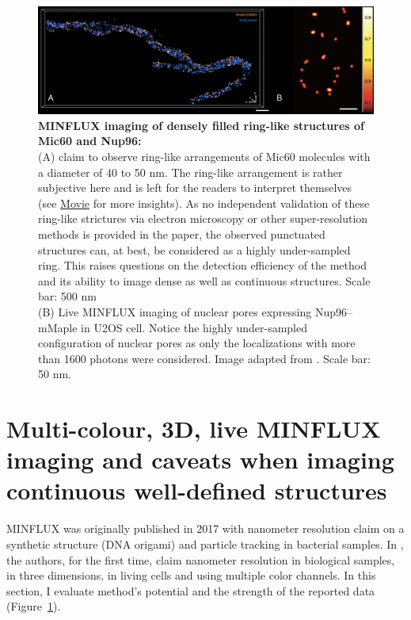 \documentclass[9pt,twocolumn,twoside]{pnas-new}
\begin{document}
\begin{figure}
\begin{center}
\includegraphics[width=17cm]{Figures/dense}
\end{center}
\caption[]{\textbf{MINFLUX imaging of densely filled ring-like structures of Mic60 and Nup96:} \\
(A) \cite{pape2020multicolor} claim to observe ring-like arrangements of Mic60 molecules with a diameter of 40 to 50 nm. The ring-like arrangement is rather subjective here and is left for the readers to interpret themselves (see  \href{http://movie-usa.glencoesoftware.com/video/10.1073/pnas.2009364117/video-6}{Movie} for more insights). As no independent validation of these ring-like strictures via electron microscopy or other super-resolution methods is provided in the paper, the observed punctuated structures can, at best, be considered as a highly under-sampled ring. This raises questions on the detection efficiency of the method and its ability to image dense as well as continuous structures. Scale bar: 500 nm \\
(B) Live MINFLUX imaging of nuclear pores expressing Nup96–mMaple in U2OS cell. Notice the highly under-sampled configuration of nuclear pores as only the localizations with more than 1600 photons were considered. Image adapted from \cite{gwosch2020minflux}. Scale bar: 50 nm.
} \label{fig:micos}
\end{figure}



\section{Multi-colour, 3D, live MINFLUX imaging  and caveats when imaging continuous well-defined structures}

MINFLUX was originally published in 2017 \citep{balzarotti2017nanometer} with nanometer resolution claim on a synthetic structure (DNA origami) and particle tracking in bacterial samples. In \cite{gwosch2020minflux}, the authors, for the first time, claim nanometer resolution in biological samples, in three dimensions, in living cells and using multiple color channels.  In this section, I evaluate method's potential and the strength of the reported data (Figure~\ref{fig:micos}).  
\end{document}
